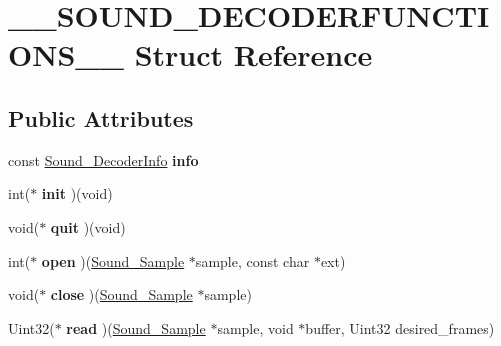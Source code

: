 \hypertarget{struct____SOUND__DECODERFUNCTIONS____}{\section{\-\_\-\-\_\-\-S\-O\-U\-N\-D\-\_\-\-D\-E\-C\-O\-D\-E\-R\-F\-U\-N\-C\-T\-I\-O\-N\-S\-\_\-\-\_\- Struct Reference}
\label{struct____SOUND__DECODERFUNCTIONS____}
}
\subsection*{Public Attributes}
\begin{DoxyCompactItemize}
\item 
\hypertarget{struct____SOUND__DECODERFUNCTIONS_____a3631a7e00a356b12340454238a2658e4}{const \hyperlink{structSound__DecoderInfo}{Sound\-\_\-\-Decoder\-Info} {\bfseries info}}\label{struct____SOUND__DECODERFUNCTIONS_____a3631a7e00a356b12340454238a2658e4}

\item 
\hypertarget{struct____SOUND__DECODERFUNCTIONS_____adf1ea7f259eea518b3ae519bfa533228}{int($\ast$ {\bfseries init} )(void)}\label{struct____SOUND__DECODERFUNCTIONS_____adf1ea7f259eea518b3ae519bfa533228}

\item 
\hypertarget{struct____SOUND__DECODERFUNCTIONS_____a012453cf150c05f8ec045b00bee16a21}{void($\ast$ {\bfseries quit} )(void)}\label{struct____SOUND__DECODERFUNCTIONS_____a012453cf150c05f8ec045b00bee16a21}

\item 
\hypertarget{struct____SOUND__DECODERFUNCTIONS_____a9a347dad7bfa8d78438b634e8e2621aa}{int($\ast$ {\bfseries open} )(\hyperlink{structSound__Sample}{Sound\-\_\-\-Sample} $\ast$sample, const char $\ast$ext)}\label{struct____SOUND__DECODERFUNCTIONS_____a9a347dad7bfa8d78438b634e8e2621aa}

\item 
\hypertarget{struct____SOUND__DECODERFUNCTIONS_____acf53843fca952b1030f5931c188f90b6}{void($\ast$ {\bfseries close} )(\hyperlink{structSound__Sample}{Sound\-\_\-\-Sample} $\ast$sample)}\label{struct____SOUND__DECODERFUNCTIONS_____acf53843fca952b1030f5931c188f90b6}

\item 
\hypertarget{struct____SOUND__DECODERFUNCTIONS_____a54aabb30f5cf4aad73a1ea89e8c8858c}{Uint32($\ast$ {\bfseries read} )(\hyperlink{structSound__Sample}{Sound\-\_\-\-Sample} $\ast$sample, void $\ast$buffer, Uint32 desired\-\_\-frames)}\label{struct____SOUND__DECODERFUNCTIONS_____a54aabb30f5cf4aad73a1ea89e8c8858c}


\end{DoxyCompactItemize}
